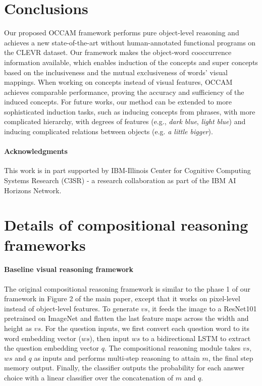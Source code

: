 \documentclass[10pt,twocolumn,letterpaper]{article}
\begin{document}
\section{Conclusions}
\vspace{-2mm}
Our proposed OCCAM framework performs pure object-level reasoning and achieves a new state-of-the-art without human-annotated functional programs on the CLEVR dataset.
Our framework makes the object-word cooccurrence information available, which enables induction of the concepts and super concepts based on the inclusiveness and the mutual exclusiveness of words' visual mappings.
When working on concepts instead of visual features, OCCAM achieves comparable performance, proving the accuracy and sufficiency of the induced concepts. 
For future works, our method can be extended to more sophisticated induction tasks, such as inducing concepts from phrases, with more complicated hierarchy, with degrees of features (e.g., \emph{dark blue}, \emph{light blue}) and inducing complicated relations between objects (e.g. \emph{a little bigger}).



\paragraph{Acknowledgments}
This work is in part supported by IBM-Illinois Center for Cognitive Computing Systems Research (C3SR) - a research collaboration as part of the IBM AI Horizons Network.

{\small


}




\clearpage
\appendix
\section{Details of compositional reasoning frameworks}
\label{app:reasoning_details}
\paragraph{Baseline visual reasoning framework} The original compositional reasoning framework \cite{hudson2018compositional} is similar to the phase 1 of our framework in Figure 2 of the main paper, except that it works on pixel-level instead of object-level features. To generate $vs$, it feeds the image to a ResNet101 \cite{He_2016_CVPR} pretrained on ImageNet \cite{deng2009imagenet} and flatten the last feature maps across the width and height as $vs$. For the question inputs, we first convert each question word to its word embedding vector ($ws$), then input $ws$ to a bidirectional LSTM \cite{hochreiter1997long,graves2005framewise} to extract the question embedding vector $q$. The compositional reasoning module takes $vs$, $ws$ and $q$ as inputs and performs multi-step reasoning to attain $m$, the final step memory output. Finally, the classifier outputs the probability for each answer choice with a linear classifier over the concatenation of $m$ and $q$. 
\vspace{-3mm}
\end{document}
